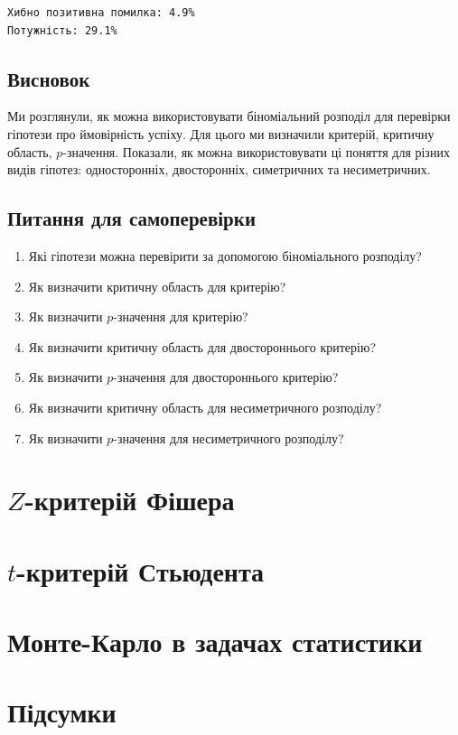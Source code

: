 \documentclass[
  letterpaper,
  10pt,
  openany]{report}
\providecommand{\tightlist}{%
  \setlength{\itemsep}{0pt}\setlength{\parskip}{0pt}}\usepackage{longtable,booktabs,array}
\theoremstyle{definition}
\theoremstyle{remark}
\begin{document}
\begin{verbatim}
Хибно позитивна помилка: 4.9%
Потужність: 29.1%
\end{verbatim}

\section{Висновок}\label{ux432ux438ux441ux43dux43eux432ux43eux43a}

Ми розглянули, як можна використовувати біноміальний розподіл для
перевірки гіпотези про ймовірність успіху. Для цього ми визначили
критерій, критичну область, \(p\)-значення. Показали, як можна
використовувати ці поняття для різних видів гіпотез: односторонніх,
двосторонніх, симетричних та несиметричних.

\section{Питання для
самоперевірки}\label{ux43fux438ux442ux430ux43dux43dux44f-ux434ux43bux44f-ux441ux430ux43cux43eux43fux435ux440ux435ux432ux456ux440ux43aux438}

\begin{enumerate}
\def\labelenumi{\arabic{enumi}.}
\tightlist
\item
  Які гіпотези можна перевірити за допомогою біноміального розподілу?
\item
  Як визначити критичну область для критерію?
\item
  Як визначити \(p\)-значення для критерію?
\item
  Як визначити критичну область для двостороннього критерію?
\item
  Як визначити \(p\)-значення для двостороннього критерію?
\item
  Як визначити критичну область для несиметричного розподілу?
\item
  Як визначити \(p\)-значення для несиметричного розподілу?
\end{enumerate}


\chapter{\texorpdfstring{\(Z\)-критерій
Фішера}{Z-критерій Фішера}}\label{sec-z-test}


\chapter{\texorpdfstring{\(t\)-критерій
Стьюдента}{t-критерій Стьюдента}}\label{sec-t-test}


\chapter{Монте-Карло в задачах статистики}\label{sec-monte-carlo}


\chapter*{Підсумки}\label{ux43fux456ux434ux441ux443ux43cux43aux438}

\end{document}
